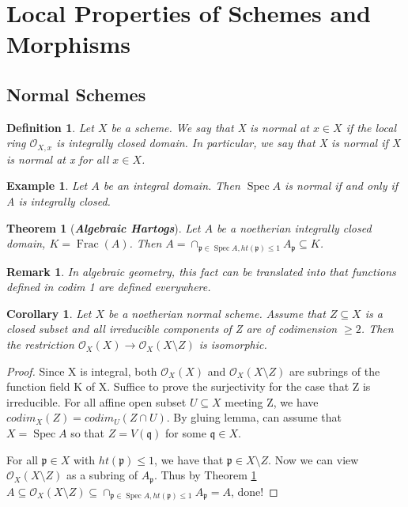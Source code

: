 \documentclass{ctexart}
\newtheorem{definition}{Definition}[section]
\newtheorem{remark}{Remark}[section]
\newtheorem{theorem}{Theorem}[section]
\newtheorem{example}{Example}[section]
\newtheorem{corollary}{Corollary}[section]
\newcommand{\spec}{\operatorname{Spec}}
\newcommand{\fraction}{\operatorname{Frac}}
\begin{document}
\section{Local Properties of Schemes and Morphisms}
\label{section:Local Properties of Schemes and Morphisms}

\subsection{Normal Schemes}
\begin{definition}
    Let $X$ be a scheme.
    We say that X is normal at $x\in X$ if the local ring $\mathcal{O}_{X, x}$ is integrally closed domain.
    In particular, we say that X is normal if X is normal at x for all $x\in X$.
\end{definition}
\begin{example}
    Let $A$ be an integral domain.
    Then $\spec A$ is normal if and only if A is integrally closed.
\end{example}
\begin{theorem}[\textbf{\emph{Algebraic Hartogs}}]
    Let $A$ be a noetherian integrally closed domain, $K = \fraction(A)$.
    Then $A = \cap_{\mathfrak{p}\in \spec A, ht(\mathfrak{p}) \le 1} A_{\mathfrak{p}} \subseteq K$.
    \label{Theorem 5.1}
\end{theorem}
\begin{remark}
    In algebraic geometry, this fact can be translated into that functions defined in codim 1 are defined everywhere.
\end{remark}
\begin{corollary}
    Let $X$ be a noetherian normal scheme.
    Assume that $Z \subseteq X$ is a closed subset and all irreducible components of Z are of codimension $\ge 2$.
    Then the restriction $\mathcal{O}_{X}(X) \longrightarrow \mathcal{O}_{X}(X \setminus Z)$ is isomorphic.
    \label{Corollary 5.1}
\end{corollary}
\begin{proof}
    Since X is integral, both $\mathcal{O}_{X}(X)$ and $\mathcal{O}_{X}(X \setminus Z)$ are subrings of the function field K of X.
    Suffice to prove the surjectivity for the case that Z is irreducible.
    For all affine open subset $U \subseteq X$ meeting Z, we have $codim_{X}(Z) = codim_{U}(Z \cap U)$.
    By gluing lemma, can assume that $X = \spec A$ so that $Z = V(\mathfrak{q})$ for some $\mathfrak{q}\in X$.
    \par
    For all $\mathfrak{p}\in X$ with $ht(\mathfrak{p}) \le 1$, we have that $\mathfrak{p}\in X \setminus Z$.
    Now we can view $\mathcal{O}_{X}(X \setminus Z)$ as a subring of $A_{\mathfrak{p}}$.
    Thus by Theorem \ref{Theorem 5.1} $A \subseteq \mathcal{O}_{X}(X \setminus Z) \subseteq \cap_{\mathfrak{p}\in \spec A, ht(\mathfrak{p}) \le 1} A_{\mathfrak{p}} = A$, done!
\end{proof}
\end{document}
